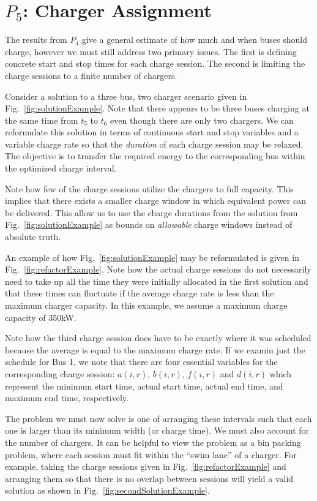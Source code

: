 



\section{$P_5$: Charger Assignment\label{sec:chargerAssignment}}
The results from $P_4$ give a general estimate of how much and when buses should charge, however we must still address two primary issues. The first is defining concrete start and stop times for each charge session. The second is limiting the charge sessions to a finite number of chargers. 
\par Consider a solution to a three bus, two charger scenario given in Fig.~\ref{fig:solutionExample}.
Note that there appears to be three buses charging at the same time from $t_5$ to $t_6$ even though there are only two chargers.  We can reformulate this solution in terms of continuous start and stop variables and a variable charge rate so that the {\it duration} of each charge session may be relaxed. The objective is to transfer the required energy to the corresponding bus within the optimized charge interval.  
\par Note how few of the charge sessions utilize the chargers to full capacity. This implies that there exists a smaller charge window in which equivalent power can be delivered. This allow us to use the charge durations from the solution from Fig.~\ref{fig:solutionExample} as bounds on {\it allowable} charge windows instead of absolute truth. 
\par An example of how Fig.~\ref{fig:solutionExample} may be reformulated is given in Fig.~\ref{fig:refactorExample}. Note how the actual charge sessions do not necessarily need to take up all the time they were initially allocated in the first solution and that these times can fluctuate if the average charge rate is less than the maximum charger capacity. In this example, we assume a maximum charge capacity of 350kW.  
\par Note how the third charge session does have to be exactly where it was scheduled because the average is equal to the maximum charge rate.
If we examin just the schedule for Bus 1, we note that there are four essential variables for the corresponding charge session: $a(i,r)$, $b(i,r)$, $f(i,r)$ and $d(i,r)$ which represent the minimum start time, actual start time, actual end time, and maximum end time, respectively. 
\par The problem we must now solve is one of arranging these intervals such that each one is larger than its minimum width (or charge time).  We must also account for the number of chargers. It can be helpful to view the problem as a bin packing problem, where each session must fit within the ``swim lane'' of a charger.  For example, taking the charge sessions given in Fig.~\ref{fig:refactorExample} and arranging them so that there is no overlap between sessions will yield a valid solution as shown in Fig.~\ref{fig:secondSolutionExample}.
